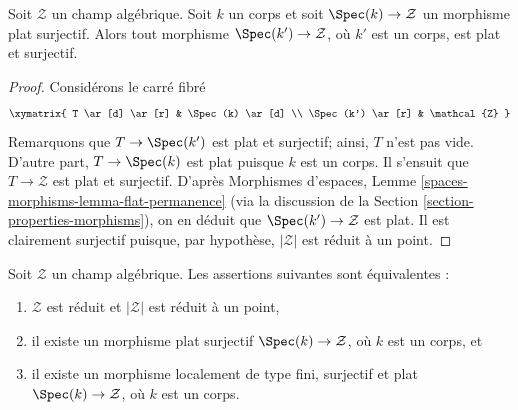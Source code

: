 \begin{lemma}
\label{lemma-flat-cover-by-field}
Soit $\mathcal{Z}$ un champ algébrique. Soit $k$ un corps et soit
$\Spec(k) \to \mathcal{Z}$ un morphisme plat surjectif. Alors tout
morphisme $\Spec(k') \to \mathcal{Z}$, où $k'$ est un corps, est
plat et surjectif.
\end{lemma}

\begin{proof}
Considérons le carré fibré
$$
\xymatrix{
T \ar[d] \ar[r] & \Spec(k) \ar[d] \\
\Spec(k') \ar[r] & \mathcal{Z}
}
$$
Remarquons que $T \to \Spec(k')$ est plat et surjectif; ainsi, $T$
n'est pas vide. D'autre part, $T \to \Spec(k)$ est plat puisque
$k$ est un corps. Il s'ensuit que $T \to \mathcal{Z}$ est plat et surjectif.
D'après
Morphismes d'espaces, Lemme \ref{spaces-morphisms-lemma-flat-permanence}
(via la discussion de la
Section \ref{section-properties-morphisms}),
on en déduit que $\Spec(k') \to \mathcal{Z}$ est plat. Il est clairement
surjectif puisque, par hypothèse, $|\mathcal{Z}|$ est réduit à un point.
\end{proof}

\begin{lemma}
\label{lemma-unique-point}
Soit $\mathcal{Z}$ un champ algébrique. Les assertions suivantes sont équivalentes :
\begin{enumerate}
\item $\mathcal{Z}$ est réduit et $|\mathcal{Z}|$ est réduit à un point,
\item il existe un morphisme plat surjectif $\Spec(k) \to \mathcal{Z}$,
où $k$ est un corps, et
\item il existe un morphisme localement de type fini, surjectif et plat
$\Spec(k) \to \mathcal{Z}$, où $k$ est un corps.
\end{enumerate}
\end{lemma}

